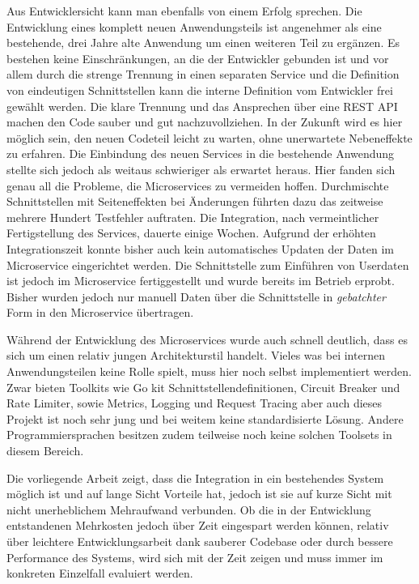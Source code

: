 Aus Entwicklersicht kann man ebenfalls von einem Erfolg sprechen. Die Entwicklung eines komplett neuen Anwendungsteils ist  angenehmer als eine bestehende, drei Jahre alte Anwendung um einen weiteren Teil zu ergänzen. Es bestehen keine Einschränkungen, an die der Entwickler gebunden ist und vor allem durch die strenge Trennung in einen separaten Service und die Definition von eindeutigen Schnittstellen kann die interne Definition vom Entwickler frei gewählt werden. Die klare Trennung und das Ansprechen über eine REST API machen den Code sauber und gut nachzuvollziehen. In der Zukunft wird es hier möglich sein, den neuen Codeteil leicht zu warten, ohne unerwartete Nebeneffekte zu erfahren. Die Einbindung des neuen Services in die bestehende Anwendung stellte sich jedoch als weitaus schwieriger als erwartet heraus. Hier fanden sich genau all die Probleme, die Microservices zu vermeiden hoffen. Durchmischte Schnittstellen mit Seiteneffekten bei Änderungen führten dazu das zeitweise mehrere Hundert Testfehler auftraten. Die Integration, nach vermeintlicher Fertigstellung des Services, dauerte einige Wochen.
Aufgrund der erhöhten Integrationszeit konnte bisher auch kein automatisches Updaten der Daten im Microservice eingerichtet werden. Die Schnittstelle zum Einführen von Userdaten ist jedoch im Microservice fertiggestellt und wurde bereits im Betrieb erprobt. Bisher wurden jedoch nur manuell Daten über die Schnittstelle in \textit{gebatchter} Form in den Microservice übertragen.

Während der Entwicklung des Microservices wurde auch schnell deutlich, dass es sich um einen relativ jungen Architekturstil handelt. Vieles was bei internen Anwendungsteilen keine Rolle spielt, muss hier noch selbst implementiert werden. Zwar bieten Toolkits wie Go kit \cite{gokit} Schnittstellendefinitionen, Circuit Breaker und Rate Limiter, sowie Metrics, Logging und Request Tracing aber auch dieses Projekt ist noch sehr jung und bei weitem keine standardisierte Lösung. Andere Programmiersprachen besitzen zudem teilweise noch keine solchen Toolsets in diesem Bereich.

Die vorliegende Arbeit zeigt, dass die Integration in ein bestehendes System möglich ist und auf lange Sicht Vorteile hat, jedoch ist sie auf kurze Sicht mit nicht unerheblichem Mehraufwand verbunden. Ob die in der Entwicklung entstandenen Mehrkosten jedoch über Zeit eingespart werden können, relativ über leichtere Entwicklungsarbeit dank sauberer Codebase oder durch bessere Performance des Systems, wird sich mit der Zeit zeigen und muss immer im konkreten Einzelfall evaluiert werden.
